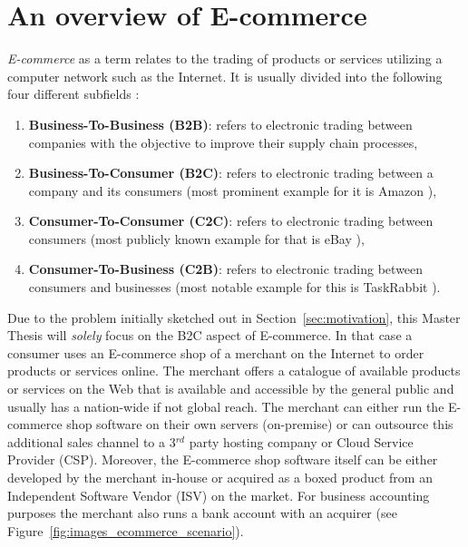 
\section{An overview of \gls{E-commerce}}
\label{sec:e_commerce_scenario}

\emph{\Gls{E-commerce}} as a term relates to the trading of products or services utilizing a computer network such as the Internet. It is usually divided into the following four different subfields \citep{sen2015study}:\@

\begin{enumerate}
  \item \textbf{Business-To-Business (\gls{B2B})}: refers to electronic trading between companies with the objective to improve their supply chain processes,
  \item \textbf{Business-To-Consumer (\gls{B2C})}: refers to electronic trading between a company and its consumers (most prominent example for it is Amazon \citep{Amazon.com}),
  \item \textbf{Consumer-To-Consumer (\gls{C2C})}: refers to electronic trading between consumers (most publicly known example for that is eBay \citep{eBayInc}),
  \item \textbf{Consumer-To-Business (\gls{C2B})}: refers to electronic trading between consumers and businesses (most notable example for this is TaskRabbit \citep{TaskRabbit}).
\end{enumerate}

Due to the problem initially sketched out in Section~\ref{sec:motivation}, this Master Thesis will \emph{solely} focus on the \gls{B2C} aspect of \gls{E-commerce}. In that case a consumer uses an \gls{E-commerce} shop of a merchant on the Internet to order products or services online. The merchant offers a catalogue of available products or services on the Web that is available and accessible by the general public and usually has a nation-wide if not global reach. The merchant can either run the \gls{E-commerce} shop software on their own servers (on-premise) or can outsource this additional sales channel to a 3$^{rd}$ party hosting company or Cloud Service Provider (\gls{CSP}). Moreover, the \gls{E-commerce} shop software itself can be either developed by the merchant in-house or acquired as a boxed product from an Independent Software Vendor (\gls{ISV}) on the market. For business accounting purposes the merchant also runs a bank account with an acquirer (see Figure~\ref{fig:images_ecommerce_scenario}). \\

